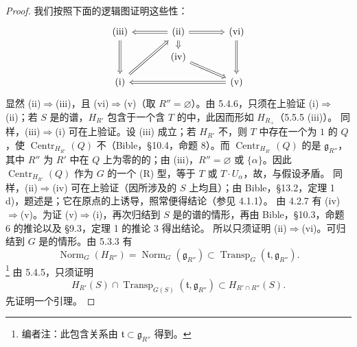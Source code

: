 \begin{proof}
我们按照下面的逻辑图证明这些性：
\[\begin{tikzcd}[column sep=large,row sep=small]
\text{(iii)} & \text{(ii)}\arrow[l,Rightarrow]\arrow[r,Rightarrow]\arrow[d,Rightarrow] & \text{(vi)}\arrow[dd,Rightarrow]\\
&\text{(iv)}\arrow[dr,Rightarrow]&\\
\text{(i)}\arrow[uu,Leftarrow]\arrow[uur,Rightarrow]&&\text{(v)}\arrow[ll,Rightarrow]
\end{tikzcd}\]
显然 (ii)$\Rightarrow$(iii)，且 (vi)$\Rightarrow$(v)（取 $R''=\varnothing$）。由 5.4.6，只须在上验证 (i)$\Rightarrow$(ii)；若 $S$ 是的谱，$H_{R'}$ 包含于一个含 $T$ 的中，此因而形如 $H_{R_+}$（5.5.5 (iii)）。
同样，(iii)$\Rightarrow$(i) 可在上验证。设 (iii) 成立；若 $H_{R'}$ 不，则 $T$ 中存在一个为 $1$ 的 $Q$，使 $\operatorname{Centr}_{H_{R'}}(Q)$ 不（Bible，\S 10.4，命题 8）。而 $\operatorname{Centr}_{H_{R'}}(Q)$ 的是 $\mathfrak g_{R''}$，其中 $R''$ 为 $R'$ 中在 $Q$ 上为零的的；由 (iii)，$R''=\varnothing$ 或 $\{\alpha\}$。因此 $\operatorname{Centr}_{H_{R'}}(Q)$ 作为 $G$ 的一个 (R) 型，等于 $T$ 或 $T\cdot U_\alpha$，故，与假设矛盾。
同样，(ii)$\Rightarrow$(iv) 可在上验证（因所涉及的 $S$ 上均且）；由 Bible，\S 13.2，定理 1 d)，题述是；它在原点的上诱导，照常便得结论（参见 4.1.1）。
由 4.2.7 有 (iv)$\Rightarrow$(v)。为证 (v)$\Rightarrow$(i)，再次归结到 $S$ 是的谱的情形，再由 Bible，\S 10.3，命题 6 的推论以及 \S 9.3，定理 1 的推论 3 得出结论。
所以只须证明 (ii)$\Rightarrow$(vi)。可归结到 $G$ 是的情形。由 5.3.3 有
\[\operatorname{Norm}_G(H_{R''})=\operatorname{Norm}_G(\mathfrak g_{R''})\subset\operatorname{Transp}_G(\mathfrak t,\mathfrak g_{R''}).\]\footnote{编者注：此包含关系由 $\mathfrak t\subset\mathfrak g_{R''}$ 得到。}
由 5.4.5，只须证明
\[H_{R'}(S)\cap\operatorname{Transp}_{G(S)}(\mathfrak t,\mathfrak g_{R''})\subset H_{R'\cap R''}(S).\tag{x}\]
先证明一个引理。
\end{proof}
